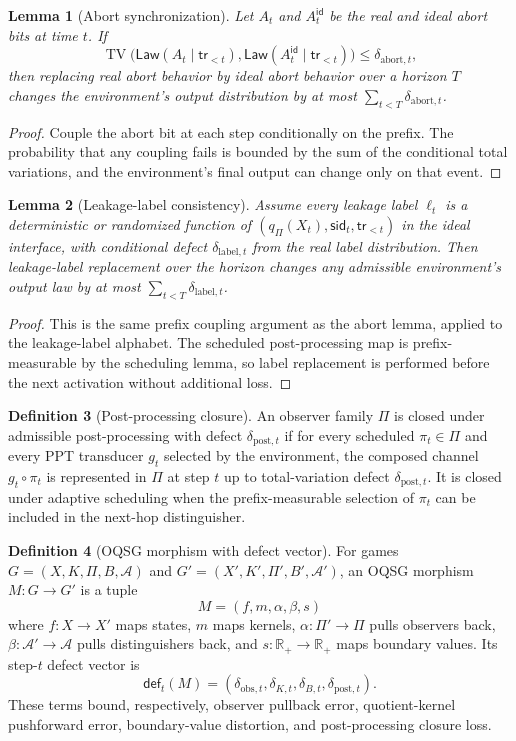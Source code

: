 \documentclass[11pt]{article}
\theoremstyle{definition}
\newtheorem{definition}{Definition}[section]
\theoremstyle{plain}
\newtheorem{lemma}[definition]{Lemma}
\theoremstyle{remark}
\DeclareMathOperator{\TV}{TV}
\newcommand{\cA}{\mathcal{A}}
\begin{document}
\begin{lemma}[Abort synchronization]
Let $A_t$ and $A_t^{\mathsf{id}}$ be the real and ideal abort bits at time $t$. If
\[
\TV\bigl(\mathsf{Law}(A_t\mid\mathsf{tr}_{<t}),\mathsf{Law}(A_t^{\mathsf{id}}\mid\mathsf{tr}_{<t})\bigr)\le \delta_{\mathrm{abort},t},
\]
then replacing real abort behavior by ideal abort behavior over a horizon $T$ changes the environment's output distribution by at most $\sum_{t<T}\delta_{\mathrm{abort},t}$.
\end{lemma}

\begin{proof}
Couple the abort bit at each step conditionally on the prefix. The probability that any coupling fails is bounded by the sum of the conditional total variations, and the environment's final output can change only on that event.
\end{proof}

\begin{lemma}[Leakage-label consistency]
Assume every leakage label $\ell_t$ is a deterministic or randomized function of $(q_\Pi(X_t),\mathsf{sid}_t,\mathsf{tr}_{<t})$ in the ideal interface, with conditional defect $\delta_{\mathrm{label},t}$ from the real label distribution. Then leakage-label replacement over the horizon changes any admissible environment's output law by at most $\sum_{t<T}\delta_{\mathrm{label},t}$.
\end{lemma}

\begin{proof}
This is the same prefix coupling argument as the abort lemma, applied to the leakage-label alphabet. The scheduled post-processing map is prefix-measurable by the scheduling lemma, so label replacement is performed before the next activation without additional loss.
\end{proof}

\begin{definition}[Post-processing closure]
An observer family $\Pi$ is closed under admissible post-processing with defect $\delta_{\mathrm{post},t}$ if for every scheduled $\pi_t\in\Pi$ and every PPT transducer $g_t$ selected by the environment, the composed channel $g_t\circ\pi_t$ is represented in $\Pi$ at step $t$ up to total-variation defect $\delta_{\mathrm{post},t}$. It is closed under adaptive scheduling when the prefix-measurable selection of $\pi_t$ can be included in the next-hop distinguisher.
\end{definition}

\begin{definition}[OQSG morphism with defect vector]
For games $G=(X,K,\Pi,B,\cA)$ and $G'=(X',K',\Pi',B',\cA')$, an OQSG morphism $M:G\to G'$ is a tuple
\[
    M=(f,m,\alpha,\beta,s)
\]
where $f:X\to X'$ maps states, $m$ maps kernels, $\alpha:\Pi'\to\Pi$ pulls observers back, $\beta:\cA'\to\cA$ pulls distinguishers back, and $s:\mathbb R_+\to\mathbb R_+$ maps boundary values. Its step-$t$ defect vector is
\[
\mathsf{def}_t(M)=(\delta_{\mathrm{obs},t},\delta_{K,t},\delta_{B,t},\delta_{\mathrm{post},t}).
\]
These terms bound, respectively, observer pullback error, quotient-kernel pushforward error, boundary-value distortion, and post-processing closure loss.
\end{definition}
\end{document}
